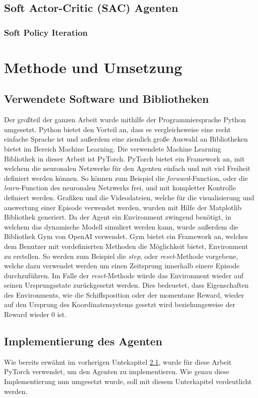 \documentclass[]{iat}
\begin{document}
\section{Soft Actor-Critic (SAC) Agenten} \label{sec:howto_sac}
\subsection{Soft Policy Iteration} \label{sec:sac_soft_policy}
\chapter{Methode und Umsetzung} \label{sec:methode_umsetzung}

\section{Verwendete Software und Bibliotheken} \label{sec:software_bibs}
Der großteil der ganzen Arbeit wurde mithilfe der Programmiersprache Python umgesetzt. Python bietet den Vorteil an, dass es vergleichsweise eine recht einfache Sprache ist und außerdem eine ziemlich große Auswahl an Bibliotheken bietet im Bereich Machine Learning. Die verwendete Machine Learning Bibliothek in dieser Arbeit ist PyTorch. PyTorch bietet ein Framework an, mit welchem die neuronalen Netzwerke für den Agenten einfach und mit viel Freiheit definiert werden können. So können zum Beispiel die \textit{forward}-Function, oder die \textit{learn}-Function des neuronalen Netzwerks frei, und mit kompletter Kontrolle definiert werden. Grafiken und die Videodateien, welche für die visualisierung und auswertung einer Episode verwendet werden, wurden mit Hilfe der Matplotlib Bibliothek generiert. Da der Agent ein Environment zwingend benötigt, in welchem das dynamische Modell simuliert werden kann, wurde außerdem die Bibliothek Gym von OpenAI verwendet. Gym bietet ein Framework an, welches dem Benutzer mit vordefinierten Methoden die Möglichkeit bietet, Environment zu erstellen. So werden zum Beispiel die \textit{step}, oder \textit{reset}-Methode vorgebene, welche dazu verwendet werden um einen Zeitsprung innerhalb einere Episode durchzuführen. Im Falle der \textit{reset}-Methode würde das Environment wieder auf seinen Ursprungsstate zurückgesetzt werden. Dies bedeuetet, dass Eigenschaften des Environments, wie die Schiffsposition oder der momentane Reward, wieder auf den Ursprung des Koordinatensystems gesetzt wird beziehungsweise der Reward wieder 0 ist.
\section{Implementierung des Agenten} \label{sec:imp_agent}
Wie bereits erwähnt im vorherigen Untekapitel \ref{sec:software_bibs}, wurde für diese Arbeit PyTorch verwendet, um den Agenten zu implementieren. Wie genau diese Implementierung nun umgesetzt wurde, soll mit diesem Unterkapitel verdeutlicht werden.
\end{document}
